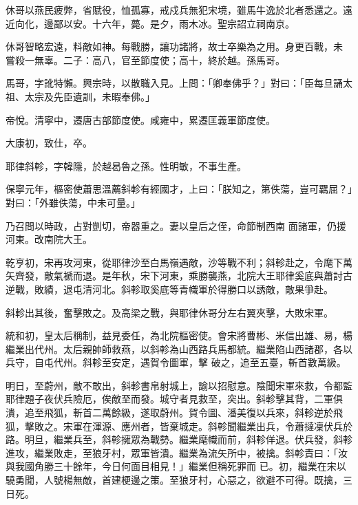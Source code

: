 \begin{pinyinscope}
 休哥以燕民疲弊，省賦役，恤孤寡，戒戍兵無犯宋境，雖馬牛逸於北者悉還之。遠近向化，邊鄙以安。十六年，薨。是夕，雨木冰。聖宗詔立祠南京。



 休哥智略宏遠，料敵如神。每戰勝，讓功諸將，故士卒樂為之用。身更百戰，未
 嘗殺一無辜。二子：高八，官至節度使；高十，終於越。孫馬哥。



 馬哥，字訛特懶。興宗時，以散職入見。上問：「卿奉佛乎？」對曰：「臣每旦誦太祖、太宗及先臣遺訓，未暇奉佛。」



 帝悅。清寧中，遷唐古部節度使。咸雍中，累遷匡義軍節度使。



 大康初，致仕，卒。



 耶律斜軫，字韓隱，於越曷魯之孫。性明敏，不事生產。



 保寧元年，樞密使蕭思溫薦斜軫有經國才，上曰：「朕知之，第佚蕩，豈可羈屈？」對曰：「外雖佚蕩，中未可量。」



 乃召問以時政，占對剴切，帝器重之。妻以皇后之侄，命節制西南
 面諸軍，仍援河東。改南院大王。



 乾亨初，宋再攻河東，從耶律沙至白馬嶺遇敵，沙等戰不利；斜軫赴之，令麾下萬矢齊發，敵氣褫而退。是年秋，宋下河東，乘勝襲燕，北院大王耶律奚底與蕭討古逆戰，敗績，退屯清河北。斜軫取奚底等青幟軍於得勝口以誘敵，敵果爭赴。



 斜軫出其後，奮擊敗之。及高梁之戰，與耶律休哥分左右翼夾擊，大敗宋軍。



 統和初，皇太后稱制，益見委任，為北院樞密使。會宋將曹彬、米信出雄、易，楊繼業出代州。太后親帥師救燕，以斜軫為山西路兵馬都統。繼業陷山西諸郡，各以兵守，自屯代州。斜軫至安定，遇賀令圖軍，擊
 破之，追至五臺，斬首數萬級。



 明日，至蔚州，敵不敢出，斜軫書帛射城上，諭以招慰意。陰聞宋軍來救，令都監耶律題子夜伏兵險厄，俟敵至而發。城守者見救至，突出。斜軫擊其背，二軍俱潰，追至飛狐，斬首二萬餘級，遂取蔚州。賀令圖、潘美復以兵來，斜軫逆於飛狐，擊敗之。宋軍在渾源、應州者，皆棄城走。斜軫聞繼業出兵，令蕭撻凜伏兵於路。明旦，繼業兵至，斜軫擁眾為戰勢。繼業麾幟而前，斜軫佯退。伏兵發，斜軫進攻，繼業敗走，至狼牙村，眾軍皆潰。繼業為流矢所中，被擒。斜軫責曰：「汝與我國角勝三十餘年，今日何面目相見！」繼業但稱死罪而
 已。初，繼業在宋以驍勇聞，人號楊無敵，首建梗邊之策。至狼牙村，心惡之，欲避不可得。既擒，三日死。




\end{pinyinscope}
